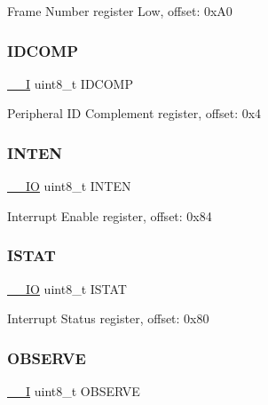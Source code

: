Frame Number register Low, offset\+: 0x\+A0 \mbox{\label{struct_u_s_b___type_aa175a27eddae37d758847685effe7ab0}} 
\subsubsection{\texorpdfstring{IDCOMP}{IDCOMP}}
{\footnotesize\ttfamily \mbox{\hyperlink{core__cm0plus_8h_af63697ed9952cc71e1225efe205f6cd3}{\+\_\+\+\_\+I}} uint8\+\_\+t I\+D\+C\+O\+MP}

Peripheral ID Complement register, offset\+: 0x4 \mbox{\label{struct_u_s_b___type_a2c270099e9174761280fdd00e12f9487}} 
\subsubsection{\texorpdfstring{INTEN}{INTEN}}
{\footnotesize\ttfamily \mbox{\hyperlink{core__cm0plus_8h_aec43007d9998a0a0e01faede4133d6be}{\+\_\+\+\_\+\+IO}} uint8\+\_\+t I\+N\+T\+EN}

Interrupt Enable register, offset\+: 0x84 \mbox{\label{struct_u_s_b___type_ab7cffdbb22df189f2a80d3b52a61a68b}} 
\subsubsection{\texorpdfstring{ISTAT}{ISTAT}}
{\footnotesize\ttfamily \mbox{\hyperlink{core__cm0plus_8h_aec43007d9998a0a0e01faede4133d6be}{\+\_\+\+\_\+\+IO}} uint8\+\_\+t I\+S\+T\+AT}

Interrupt Status register, offset\+: 0x80 \mbox{\label{struct_u_s_b___type_a25809d192dc2d1e4b676d5b6c935973f}} 
\subsubsection{\texorpdfstring{OBSERVE}{OBSERVE}}
{\footnotesize\ttfamily \mbox{\hyperlink{core__cm0plus_8h_af63697ed9952cc71e1225efe205f6cd3}{\+\_\+\+\_\+I}} uint8\+\_\+t O\+B\+S\+E\+R\+VE}

